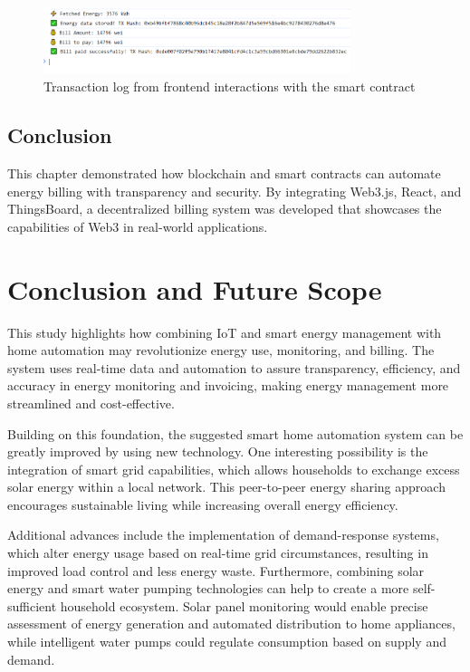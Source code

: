 \documentclass[a4paper,12pt]{report}
\begin{document}
 \begin{figure}[H]
 \centering
 \includegraphics[width=0.8\textwidth]{frontend Logs.PNG}
 \caption{Transaction log from frontend interactions with the smart contract}
 \label{fig:frontend_transactions}
 \end{figure}
 
 \section{Conclusion}
 This chapter demonstrated how blockchain and smart contracts can automate energy billing with transparency and security. By integrating Web3.js, React, and ThingsBoard, a decentralized billing system was developed that showcases the capabilities of Web3 in real-world applications.
 
 \chapter{Conclusion and Future Scope}

This study highlights how combining IoT and smart energy management with home automation may revolutionize energy use, monitoring, and billing.  The system uses real-time data and automation to assure transparency, efficiency, and accuracy in energy monitoring and invoicing, making energy management more streamlined and cost-effective.
 
Building on this foundation, the suggested smart home automation system can be greatly improved by using new technology.  One interesting possibility is the integration of smart grid capabilities, which allows households to exchange excess solar energy within a local network.  This peer-to-peer energy sharing approach encourages sustainable living while increasing overall energy efficiency.
 
Additional advances include the implementation of demand-response systems, which alter energy usage based on real-time grid circumstances, resulting in improved load control and less energy waste.  Furthermore, combining solar energy and smart water pumping technologies can help to create a more self-sufficient household ecosystem.  Solar panel monitoring would enable precise assessment of energy generation and automated distribution to home appliances, while intelligent water pumps could regulate consumption based on supply and demand.
 
\end{document}
